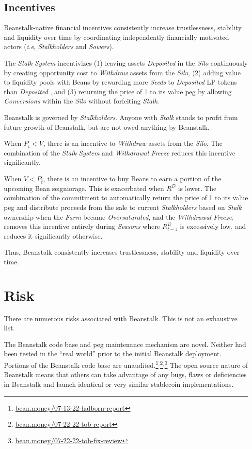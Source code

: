 \documentclass[tikz]{article}
\newcommand{\term}[1]{\textsl{#1}}
\newcommand{\Bean}{} %
\begin{document}
\subsection{Incentives}
Beanstalk-native financial incentives consistently increase trustlessness, stability and liquidity over time by coordinating independently financially motivated actors (\term{i.e}, \term{Stalkholders} and \term{Sowers}). 

The \term{Stalk System} incentivizes (1) leaving assets \term{Deposited} in the \term{Silo} continuously by creating opportunity cost to \term{Withdraw} assets from the \term{Silo}, (2) adding value to liquidity pools with Beans by rewarding more \term{Seeds} to \term{Deposited} LP tokens than \term{Deposited} \Bean, and (3) returning the price of \Bean1 to its value peg by allowing \term{Conversions} within the \term{Silo} without forfeiting \term{Stalk}.

Beanstalk is governed by \term{Stalkholders}. Anyone with \term{Stalk} stands to profit from future growth of Beanstalk, but are not owed anything by Beanstalk. 

When $P_{\overline{t}} < V$, there is an incentive to \term{Withdraw} assets from the \term{Silo}. The combination of the \term{Stalk System} and \term{Withdrawal} \term{Freeze} reduces this incentive significantly.

When $V < P_{\overline{t}}$, there is an incentive to buy Beans to earn a portion of the upcoming Bean seigniorage. This is exacerbated when $R^D$ is lower. The combination of the commitment to automatically return the price of \Bean1 to its value peg and distribute proceeds from the sale to current \term{Stalkholders} based on \term{Stalk} ownership when the \term{Farm} became \term{Oversaturated}, and the \term{Withdrawal} \term{Freeze}, removes this incentive entirely during \term{Seasons} where $R^D_{t-1}$ is excessively low, and reduces it significantly otherwise.

Thus, Beanstalk consistently increases trustlessness, stability and liquidity over time.

\section{Risk}
There are numerous risks associated with Beanstalk. This is not an exhaustive list.

The Beanstalk code base and peg maintenance mechanism are novel. Neither had been tested in the “real world” prior to the initial Beanstalk deployment. Portions of the Beanstalk code base are unaudited.\footnote{\href{https://bean.money/07-13-22-halborn-report}{bean.money/07-13-22-halborn-report}}$^{,}$\footnote{\href{https://bean.money/07-22-22-tob-report}{bean.money/07-22-22-tob-report}}$^{,}$\footnote{\href{https://bean.money/07-22-22-tob-fix-review}{bean.money/07-22-22-tob-fix-review}} The open source nature of Beanstalk means that others can take advantage of any bugs, flaws or deficiencies in Beanstalk and launch identical or very similar stablecoin implementations.
\end{document}
